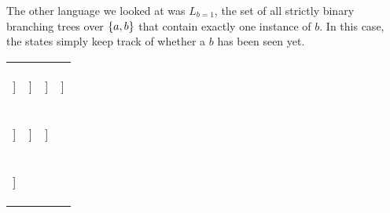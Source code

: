 \begin{examplebox}
    The other language we looked at was $L_{b=1}$, the set of all strictly binary branching trees over $\left \{ a,b \right \}$ that contain exactly one instance of $b$.
    In this case, the states simply keep track of whether a $b$ has been seen yet.
    \begin{center}
        \begin{tabular}{cccc}
            \begin{forest}
                [\kState{0}{a}
                    [\kState{0}{\RightEdge}]
                ]
            \end{forest}
            &
            \begin{forest}
                [\kState{1}{b}
                    [\kState{1}{\RightEdge}]
                ]
            \end{forest}
            &
            \begin{forest}
                [\kState{1}{\LeftEdge}
                    [\kState{1}{a}]
                ]
            \end{forest}
            &
            \begin{forest}
                [\kState{1}{\LeftEdge}
                    [\kState{1}{b}]
                ]
            \end{forest}
            \\
            \begin{forest}
                [\kState{0}{a}
                    [\kState{0}{a}]
                    [\kState{0}{a}]
                ]
            \end{forest}
            &
            \begin{forest}
                [\kState{1}{a}
                    [\kState{0}{a}]
                    [\kState{1}{a}]
                ]
            \end{forest}
            &
            \begin{forest}
                [\kState{1}{a}
                    [\kState{1}{a}]
                    [\kState{0}{a}]
                ]
            \end{forest}
            \\
            \begin{forest}
                [\kState{1}{a}
                    [\kState{0}{a}]
                    [\kState{1}{b}]
                ]
            \end{forest}
            &
            \begin{forest}
                [\kState{1}{a}
                    [\kState{1}{b}]

\end{forest}
\end{tabular}
\end{center}
\end{examplebox}
